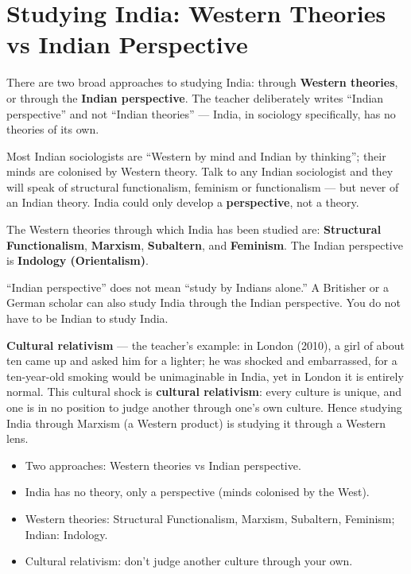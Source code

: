 \section{Studying India: Western Theories vs Indian Perspective}

There are two broad approaches to studying India: through \textbf{Western theories}, or through the \textbf{Indian perspective}. The teacher deliberately writes ``Indian perspective'' and not ``Indian theories'' --- India, in sociology specifically, has no theories of its own.

\begin{CriticalPoint}
Most Indian sociologists are ``Western by mind and Indian by thinking''; their minds are colonised by Western theory. Talk to any Indian sociologist and they will speak of structural functionalism, feminism or functionalism --- but never of an Indian theory. India could only develop a \textbf{perspective}, not a theory.
\end{CriticalPoint}

The Western theories through which India has been studied are: \textbf{Structural Functionalism}, \textbf{Marxism}, \textbf{Subaltern}, and \textbf{Feminism}. The Indian perspective is \textbf{Indology (Orientalism)}.

\begin{KeyConcept}
``Indian perspective'' does not mean ``study by Indians alone.'' A Britisher or a German scholar can also study India through the Indian perspective. You do not have to be Indian to study India.
\end{KeyConcept}

\begin{ExampleBox}
\textbf{Cultural relativism} --- the teacher's example: in London (2010), a girl of about ten came up and asked him for a lighter; he was shocked and embarrassed, for a ten-year-old smoking would be unimaginable in India, yet in London it is entirely normal. This cultural shock is \textbf{cultural relativism}: every culture is unique, and one is in no position to judge another through one's own culture. Hence studying India through Marxism (a Western product) is studying it through a Western lens.
\end{ExampleBox}

\begin{QuickRevision}
\begin{itemize}
\item Two approaches: Western theories vs Indian perspective.
\item India has no theory, only a perspective (minds colonised by the West).
\item Western theories: Structural Functionalism, Marxism, Subaltern, Feminism; Indian: Indology.
\item Cultural relativism: don't judge another culture through your own.
\end{itemize}
\end{QuickRevision}

